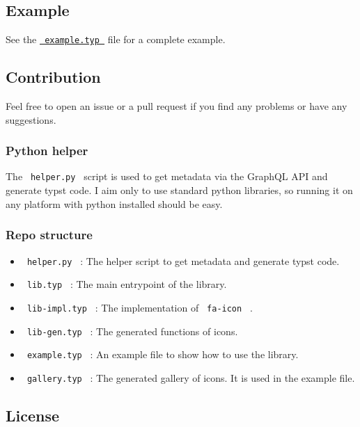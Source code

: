 \subsection{Example}\label{example}

See the
\href{https://typst.app/project/rQwGUWt5p33vrsb_uNPR9F}{\texttt{\ example.typ\ }}
file for a complete example.

\subsection{Contribution}\label{contribution}

Feel free to open an issue or a pull request if you find any problems or
have any suggestions.

\subsubsection{Python helper}\label{python-helper}

The \texttt{\ helper.py\ } script is used to get metadata via the
GraphQL API and generate typst code. I aim only to use standard python
libraries, so running it on any platform with python installed should be
easy.

\subsubsection{Repo structure}\label{repo-structure}

\begin{itemize}
\tightlist
\item
  \texttt{\ helper.py\ } : The helper script to get metadata and
  generate typst code.
\item
  \texttt{\ lib.typ\ } : The main entrypoint of the library.
\item
  \texttt{\ lib-impl.typ\ } : The implementation of \texttt{\ fa-icon\ }
  .
\item
  \texttt{\ lib-gen.typ\ } : The generated functions of icons.
\item
  \texttt{\ example.typ\ } : An example file to show how to use the
  library.
\item
  \texttt{\ gallery.typ\ } : The generated gallery of icons. It is used
  in the example file.
\end{itemize}

\subsection{License}\label{license}


